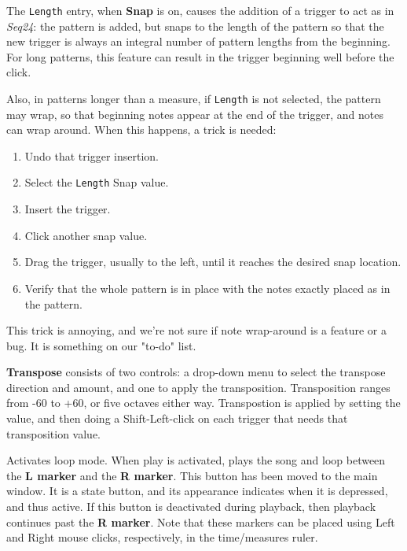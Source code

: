   The \texttt{Length} entry, when \textbf{Snap} is on, causes the addition of
   a trigger to act as in \textsl{Seq24}:  the pattern is added, but snaps to
   the length of the pattern so that the new trigger is always an integral
   number of pattern lengths from the beginning.  For long patterns, this
   feature can result in the trigger beginning well before the click.

   Also, in patterns longer than a measure, if \texttt{Length} is not selected,
   the pattern may wrap, so that beginning notes appear at the end of the
   trigger, and notes can wrap around.  When this happens, a trick is needed:

   \begin{enumerate}
      \item Undo that trigger insertion.
      \item Select the \texttt{Length} Snap value.
      \item Insert the trigger.
      \item Click another snap value.
      \item Drag the trigger, usually to the left, until it reaches the
         desired snap location.
      \item Verify that the whole pattern is in place with the notes exactly
         placed as in the pattern.
   \end{enumerate}

   This trick is annoying, and we're not sure if note wrap-around
   is a feature or a bug.
   It is something on our "to-do" list.

   \textbf{Transpose} consists of two controls:
   a drop-down menu to select the transpose direction and amount,
   and one to apply the transposition.
   Transposition ranges from -60 to +60, or five octaves either way.
   Transpostion is applied by setting the value, and then doing
   a Shift-Left-click on each trigger that needs that transposition value.

   Activates loop mode. When play is activated, plays the song and loop
   between the
   \textbf{L marker} and the \textbf{R marker}.
   This button has been moved to the main window.
   It is a state button, and its appearance indicates when it is
   depressed, and thus active.
   If this button is deactivated during playback, then playback
   continues past the \textbf{R marker}.
   Note that these markers can be placed using Left
   and Right mouse clicks, respectively, in the time/measures ruler.

